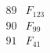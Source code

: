 \documentclass{article}
\begin{document}
{$$\begin{array}{|r|*{7}{r|}}
\\
\hline
89 
 & F_{123} &
 & 
 & 
 & 
 & 
 & 
\\
\hline
90 
 & F_{99} &
 & 
 & 
 & 
 & 
 & 
\\
\hline
91 
 & F_{41} &
 & 
 & 
 & 

\end{array}$$}
\end{document}
